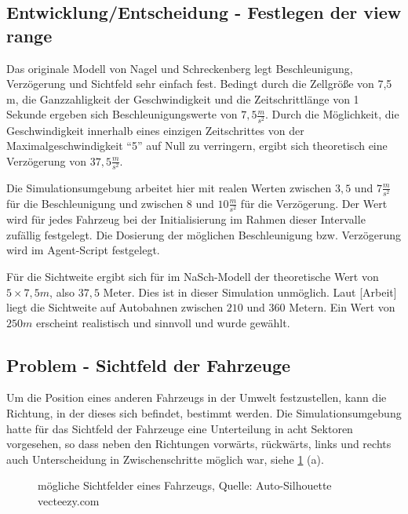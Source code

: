 \subsection{Entwicklung/Entscheidung - Festlegen der view range}

Das originale Modell von Nagel und Schreckenberg legt Beschleunigung, Verzögerung und Sichtfeld sehr einfach fest.
Bedingt durch die Zellgröße von 7,5 m, die Ganzzahligkeit der Geschwindigkeit und die Zeitschrittlänge von 1 Sekunde ergeben sich Beschleunigungswerte von $7,5 \frac{m}{s^{2}}$. 
Durch die Möglichkeit, die Geschwindigkeit innerhalb eines einzigen Zeitschrittes von der Maximalgeschwindigkeit \enquote{5} auf Null zu verringern, ergibt sich theoretisch eine Verzögerung von $37,5 \frac{m}{s^{2}}$.

Die Simulationsumgebung arbeitet hier mit realen Werten zwischen $3,5$ und $7 \frac{m}{s^{2}}$ für die Beschleunigung und zwischen $8$ und $10 \frac{m}{s^{2}}$ für die Verzögerung.
Der Wert wird für jedes Fahrzeug bei der Initialisierung im Rahmen dieser Intervalle zufällig festgelegt.
Die Dosierung der möglichen Beschleunigung bzw. Verzögerung wird im Agent-Script festgelegt.

Für die Sichtweite ergibt sich für im NaSch-Modell der theoretische Wert von $5 \times 7,5 m$, also $37,5$ Meter.
Dies ist in dieser Simulation unmöglich.
Laut [Arbeit] liegt die Sichtweite auf Autobahnen zwischen $210$ und $360$ Metern.
Ein Wert von $250 m$ erscheint realistisch und sinnvoll und wurde gewählt.



\subsection{Problem - Sichtfeld der Fahrzeuge}

Um die Position eines anderen Fahrzeugs in der Umwelt festzustellen, kann die Richtung, in der dieses sich befindet, bestimmt werden.
Die Simulationsumgebung hatte für das Sichtfeld der Fahrzeuge eine Unterteilung in acht Sektoren vorgesehen, so dass neben den Richtungen vorwärts, rückwärts, links und rechts auch Unterscheidung in Zwischenschritte möglich war, siehe \cref{figure:car-view-sectors} (a).

\begin{figure}[hptb]
  \centering 
   \qquad 
   \qquad 
  \caption{mögliche Sichtfelder eines Fahrzeugs, Quelle: Auto-Silhouette vecteezy.com} 
  \label{figure:car-view-sectors}
\end{figure}

